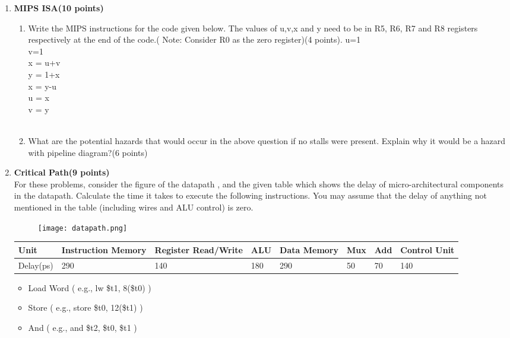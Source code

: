 \documentclass[a4paper,10pt]{article}
\begin{document}
\begin{enumerate}
\begin{verbatim}
\end{verbatim}
\item \textbf{MIPS ISA(10 points)}
\begin{enumerate}
    \item Write the MIPS instructions for the code given below. The values of u,v,x and y need to be in R5, R6, R7 and R8 registers respectively at the end of the code.( Note: Consider R0 as the zero register)(4 points).
    \clearpage
        u=1 \\
        v=1\\
        x = u+v\\
        y = 1+x\\
        x = y-u\\
        u = x \\
        v = y \\
        \\
    \item What are the potential hazards that would occur in the above question if no stalls were present. Explain why it would be a hazard with pipeline diagram?(6 points)
  \end{enumerate}
  \item \textbf{Critical Path(9 points)}\\
  For these problems, consider the figure of the datapath , and the given table which shows the delay of micro-architectural components in the datapath. Calculate the time it takes to execute the following instructions. You may assume that the delay of anything not mentioned in the table (including wires and ALU control) is zero. 
  \begin{figure}[!h]
        \centering
        \texttt{[image: datapath.png]}
    \end{figure}
    \begin{center}
    \begin{table}[h]
\begin{tabular}{ |l|l|l|l|l|l|l|l|}
\hline
Unit &	Instruction Memory & Register Read/Write & ALU & Data Memory & Mux & Add & Control Unit \\ \hline
Delay(ps) & 290 & 140 & 180 & 290 & 50 & 70 & 140    \\ \hline

\end{tabular}
\end{table}
\end{center}
\begin{itemize}
    \item Load Word ( e.g., lw \$t1, 8(\$t0) ) 
    \item  Store ( e.g., store \$t0, 12(\$t1) ) 
    \item And ( e.g., and \$t2, \$t0, \$t1 ) 
\end{itemize}
\end{enumerate}
\end{document}
